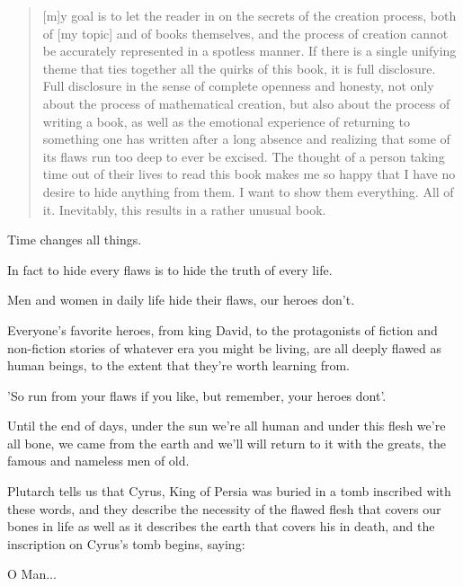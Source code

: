 \Sentence
{ \hX{} }
{ \eX{} }
{
    \begin{quote}
    [m]y goal is to let the reader in on the secrets of the creation process, both of [my topic] and of books themselves, and the process of creation cannot be accurately represented in a spotless manner. If there is a single unifying theme that ties together all the quirks of this book, it is full disclosure. Full disclosure in the sense of complete openness and honesty, not only about the process of mathematical creation, but also about the process of writing a book, as well as the emotional experience of returning to something one has written after a long absence and realizing that some of its flaws run too deep to ever be excised. The thought of a person taking time out of their lives to read this book makes me so happy that I have no desire to hide anything from them. I want to show them everything. All of it. Inevitably, this results in a rather unusual book.
    \end{quote}
}

\Sentence
{ \hX{} }
{ \eX{} }
{
    Time changes all things.
}

\Sentence
{ \hX{} }
{ \eX{} }
{
    In fact to hide every flaws is to hide the truth of every life.
}

\Sentence
{ \hX{} }
{ \eX{} }
{
    Men and women in daily life hide their flaws, our heroes don't.
}

\Sentence
{ \hX{} }
{ \eX{} }
{
    Everyone's favorite heroes, from king David, to the protagonists of fiction and non-fiction stories of whatever era you might be living, are all deeply flawed as human beings, to the extent that they're worth learning from.
}

\Sentence
{ \hX{} }
{ \eX{} }
{
    'So run from your flaws if you like, but remember, your heroes dont'.
}

\Sentence
{ \hX{} }
{ \eX{} }
{
    Until the end of days, under the sun we're all human and under this flesh we're all bone, we came from the earth and we'll will return to it with the greats, the famous and nameless  men of old.
}

\Sentence
{ \hX{} }
{ \eX{} }
{
    Plutarch tells us that Cyrus, King of Persia was buried in a tomb inscribed with these words, and they describe the necessity of the flawed flesh that covers our bones in life as well as it describes the earth that covers his in death, and the inscription on Cyrus's tomb begins, saying:
}

\Sentence
{ \hX{} }
{ \eX{} }
{
    O Man...
}

